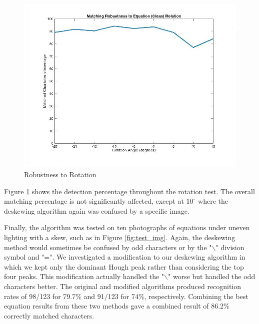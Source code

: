 \documentclass[journal]{IEEEtran}
\begin{document}
\begin{figure}[!t]
    \centering
    \includegraphics[width=\columnwidth]{rotation_robust}
    \caption{Robustness to Rotation}
    \label{fig:rotation_robust}
\end{figure}

Figure \ref{fig:rotation_robust} shows the detection percentage throughout the rotation test. The overall matching percentage is not significantly affected, except at $10^\circ$ where the deskewing algorithm again was confused by a specific image.

Finally, the algorithm was tested on ten photographs of equations under uneven lighting with a skew, such as in Figure \ref{fig:test_img}. Again, the deskewing method would sometimes be confused by odd characters or by the "$\backslash$" division symbol and "=". We investigated a modification to our deskewing algorithm in which we kept only the dominant Hough peak rather than considering the top four peaks. This modification actually handled the "$\backslash$" worse but handled the odd characters better. The original and modified algorithms produced recognition rates of 98/123 for 79.7\% and 91/123 for 74\%, respectively. Combining the best equation results from these two methods gave a combined result of 86.2\% correctly matched characters.
\end{document}
